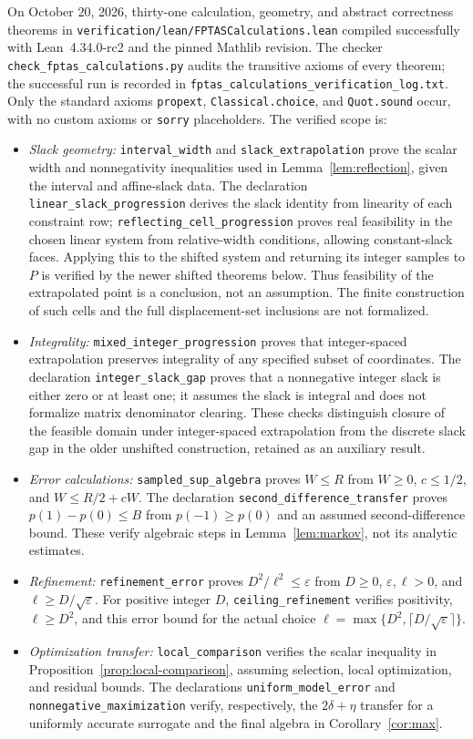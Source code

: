 \documentclass[11pt]{article}
\theoremstyle{definition}\newtheorem{definition}{Definition}[section]
\theoremstyle{remark}\newtheorem{remark}[theorem]{Remark}
\newcommand{\eps}{\varepsilon}
\begin{document}
On October 20, 2026, thirty-one calculation, geometry, and abstract correctness theorems in \texttt{verification/lean/FPTASCalculations.lean} compiled successfully with Lean~4.34.0-rc2 and the pinned Mathlib revision. The checker \texttt{check\_fptas\_calculations.py} audits the transitive axioms of every theorem; the successful run is recorded in \texttt{fptas\_calculations\_verification\_log.txt}. Only the standard axioms \texttt{propext}, \texttt{Classical.choice}, and \texttt{Quot.sound} occur, with no custom axioms or \texttt{sorry} placeholders. The verified scope is:
\begin{itemize}[leftmargin=*]
\item \emph{Slack geometry:} \texttt{interval\_width} and \texttt{slack\_extrapolation} prove the scalar width and nonnegativity inequalities used in Lemma~\ref{lem:reflection}, given the interval and affine-slack data. The declaration \texttt{linear\_slack\_progression} derives the slack identity from linearity of each constraint row; \texttt{reflecting\_cell\_progression} proves real feasibility in the chosen linear system from relative-width conditions, allowing constant-slack faces. Applying this to the shifted system and returning its integer samples to $P$ is verified by the newer shifted theorems below. Thus feasibility of the extrapolated point is a conclusion, not an assumption. The finite construction of such cells and the full displacement-set inclusions are not formalized.
\item \emph{Integrality:} \texttt{mixed\_integer\_progression} proves that integer-spaced extrapolation preserves integrality of any specified subset of coordinates. The declaration \texttt{integer\_slack\_gap} proves that a nonnegative integer slack is either zero or at least one; it assumes the slack is integral and does not formalize matrix denominator clearing. These checks distinguish closure of the feasible domain under integer-spaced extrapolation from the discrete slack gap in the older unshifted construction, retained as an auxiliary result.
\item \emph{Error calculations:} \texttt{sampled\_sup\_algebra} proves $W\le R$ from $W\ge0$, $c\le1/2$, and $W\le R/2+cW$. The declaration \texttt{second\_difference\_transfer} proves $p(1)-p(0)\le B$ from $p(-1)\ge p(0)$ and an assumed second-difference bound. These verify algebraic steps in Lemma~\ref{lem:markov}, not its analytic estimates.
\item \emph{Refinement:} \texttt{refinement\_error} proves $D^2/\ell^2\le\eps$ from $D\ge0$, $\eps,\ell>0$, and $\ell\ge D/\sqrt\eps$. For positive integer $D$, \texttt{ceiling\_refinement} verifies positivity, $\ell\ge D^2$, and this error bound for the actual choice $\ell=\max\{D^2,\lceil D/\sqrt\eps\rceil\}$.

\item \emph{Optimization transfer:} \texttt{local\_comparison} verifies the scalar inequality in Proposition~\ref{prop:local-comparison}, assuming selection, local optimization, and residual bounds. The declarations \texttt{uniform\_model\_error} and \texttt{nonnegative\_maximization} verify, respectively, the $2\delta+\eta$ transfer for a uniformly accurate surrogate and the final algebra in Corollary~\ref{cor:max}.
\end{itemize}
\end{document}
